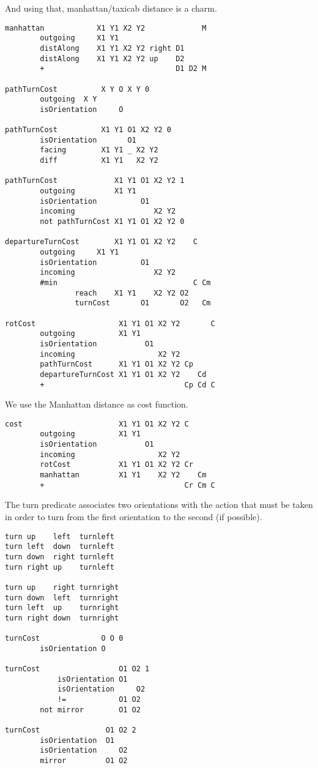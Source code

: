 And using that, manhattan/taxicab distance is a charm.

\begin{verbatim}
manhattan            X1 Y1 X2 Y2             M
        outgoing     X1 Y1
        distAlong    X1 Y1 X2 Y2 right D1
        distAlong    X1 Y1 X2 Y2 up    D2
        +                              D1 D2 M

pathTurnCost          X Y O X Y 0
        outgoing  X Y
        isOrientation     O

pathTurnCost          X1 Y1 O1 X2 Y2 0
        isOrientation       O1
        facing        X1 Y1 _ X2 Y2
        diff          X1 Y1   X2 Y2

pathTurnCost             X1 Y1 O1 X2 Y2 1
        outgoing         X1 Y1
        isOrientation          O1
        incoming                  X2 Y2
        not pathTurnCost X1 Y1 O1 X2 Y2 0

departureTurnCost        X1 Y1 O1 X2 Y2    C
        outgoing     X1 Y1
        isOrientation          O1
        incoming                  X2 Y2
        #min                               C Cm
                reach    X1 Y1    X2 Y2 O2
                turnCost       O1       O2   Cm

rotCost                   X1 Y1 O1 X2 Y2       C
        outgoing          X1 Y1
        isOrientation           O1
        incoming                   X2 Y2
        pathTurnCost      X1 Y1 O1 X2 Y2 Cp
        departureTurnCost X1 Y1 O1 X2 Y2    Cd
        +                                Cp Cd C
\end{verbatim}

We use the Manhattan distance as cost function.

\begin{verbatim}
cost                      X1 Y1 O1 X2 Y2 C
        outgoing          X1 Y1
        isOrientation           O1
        incoming                   X2 Y2
        rotCost           X1 Y1 O1 X2 Y2 Cr
        manhattan         X1 Y1    X2 Y2    Cm
        +                                Cr Cm C
\end{verbatim}

The turn predicate associates two orientations with the action that must
be taken in order to turn from the first orientation to the second (if
possible).

\begin{verbatim}
turn up    left  turnleft
turn left  down  turnleft
turn down  right turnleft
turn right up    turnleft

turn up    right turnright
turn down  left  turnright
turn left  up    turnright
turn right down  turnright

turnCost              O O 0
        isOrientation O

turnCost                  O1 O2 1
            isOrientation O1
            isOrientation     O2
            !=            O1 O2
        not mirror        O1 O2

turnCost               O1 O2 2
        isOrientation  O1
        isOrientation     O2
        mirror         O1 O2
\end{verbatim}

